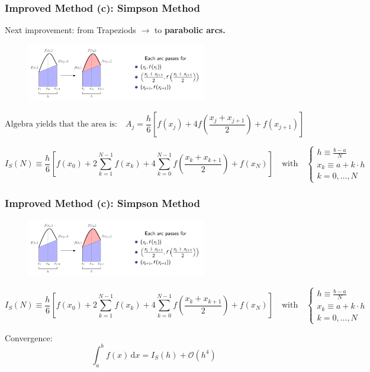 \documentclass[11pt,aspectratio=169]{beamer}
\begin{document}
\begin{frame}
\frametitle{Improved Method (c): Simpson Method}
Next improvement: from Trapeziods $\rightarrow$ to \textbf{parabolic arcs.}
\pause
\begin{figure}
	\centering
	\includegraphics[width=0.7\textwidth]{fig/integration-simpson-with-text}
\end{figure}%
\pause
\begin{equation*}
\text{Algebra yields that the area is:} \quad A_j = \frac{h}{6} \left[ f(x_j) + 4 f\left(\frac{x_j + x_{j+1}}{2}\right) + f(x_{j+1}) \right]
\end{equation*}

\pause
\begin{equation*}
	I_S(N) \equiv \frac{h}{6} \left[ f(x_0) + 2\sum_{k=1}^{N-1} f(x_k)+4\sum_{k=0}^{N-1}f\left(\frac{x_k + x_{k+1}}{2}\right) + f(x_{N}) \right] 
	\quad \text{with} \quad
	\begin{cases}
		h \equiv \frac{b-a}{N} \\
		x_k \equiv a + k \cdot h \\
		k = 0, \ldots, N
	\end{cases}
\end{equation*}

\end{frame}

\begin{frame}
\frametitle{Improved Method (c): Simpson Method}
\begin{figure}
	\centering
	\includegraphics[width=0.7\textwidth]{fig/integration-simpson-with-text}
\end{figure}%
\begin{equation*}
	I_S(N) \equiv \frac{h}{6} \left[ f(x_0) + 2\sum_{k=1}^{N-1} f(x_k)+4\sum_{k=0}^{N-1}f\left(\frac{x_k + x_{k+1}}{2}\right) + f(x_{N}) \right] 
	\quad \text{with} \quad
	\begin{cases}
		h \equiv \frac{b-a}{N} \\
		x_k \equiv a + k \cdot h \\
		k = 0, \ldots, N
	\end{cases}
\end{equation*}

Convergence:
\begin{equation*}
	\int_a^b f(x) \, \mathrm{d}x = I_S(h) + \mathcal{O}\left(h^4\right)
\end{equation*}
	
\end{frame}
\end{document}
